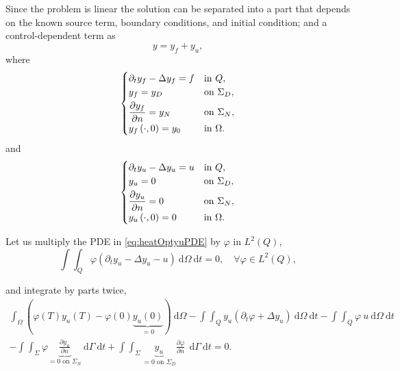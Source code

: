 \documentclass[12pt,a4paper]{article}
\newcommand{\dom}{\ \mathrm{d} \Omega}
\newcommand{\dg}{\ \mathrm{d} \Gamma}
\newcommand{\dt}{\ \mathrm{d} t}
\theoremstyle{plain}
\theoremstyle{definition}
\begin{document}
Since the problem is linear the solution can be separated into a part that depends on the known source term, boundary conditions, and initial condition; and a control-dependent term as
%
\begin{equation}
y = y_f + y_u,
\end{equation}
%
where
%
\begin{equation} \label{eq:heatOptyfPDE}
\begin{cases}
\partial_t y_f - \Delta y_f = f & \text{in } Q,\\
y_f = y_D & \text{on } \Sigma_D, \vspace{1mm}\\
\displaystyle \frac{\partial y_f}{\partial n} = y_N & \text{on } \Sigma_N,\\
y_f \left( \cdot, 0 \right) = y_0 & \text{in } \Omega.
\end{cases}
\end{equation}
%
and
%
\begin{equation} \label{eq:heatOptyuPDE}
\begin{cases}
\partial_t y_u - \Delta y_u = u & \text{in } Q, \\
y_u = 0 & \text{on } \Sigma_D, \vspace{1mm}\\
\displaystyle \frac{\partial y_u}{\partial n} = 0 & \text{on } \Sigma_N,\\
y_u \left( \cdot, 0 \right) = 0 & \text{in } \Omega.
\end{cases}
\end{equation}

Let us multiply the PDE in \eqref{eq:heatOptyuPDE} by $\varphi$ in $L^2 \left( Q \right)$,
%
\begin{equation*}
\int \int_Q \varphi \left( \partial_t y_u - \Delta y_u - u \right) \dom \dt = 0, \quad \forall \varphi \in L^2 \left( Q \right),
\end{equation*}

and integrate by parts twice,
%
\begin{equation*}
\begin{split}
\int_{\Omega} \left( \varphi \left( T \right) y_u \left( T \right) - \varphi \left( 0 \right) \underbrace{y_u \left( 0 \right)}_{=0} \right) \dom - \int \int_Q y_u \left( \partial_t \varphi + \Delta y_u \right) \dom \dt - \int \int_Q \varphi \ u \dom \dt \\ - \int \int_{\Sigma} \varphi \underbrace{\displaystyle \frac{\partial y_u}{\partial n}}_{=0 \text{ on } \Sigma_N} \dg \dt + \int \int_{\Sigma} \underbrace{y_u}_{=0 \text{ on } \Sigma_D} \displaystyle \frac{\partial \varphi}{\partial n} \ \dg \dt = 0.
\end{split}
\end{equation*}
\end{document}
